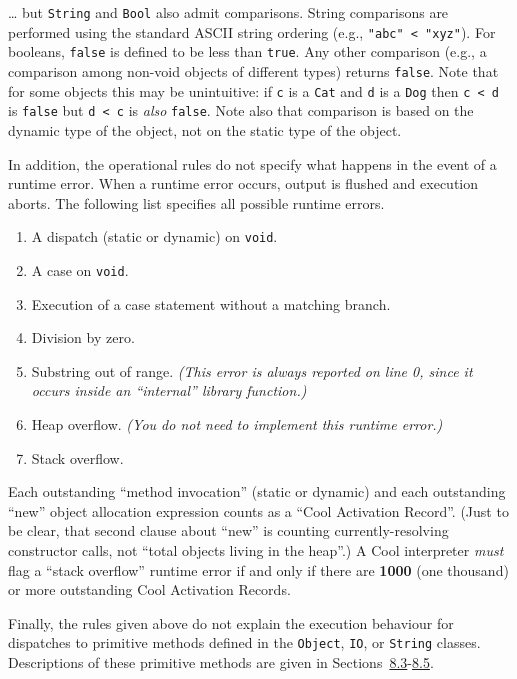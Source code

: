 \documentclass[]{article}
\begin{document}
\ldots{} but \texttt{String} and \texttt{Bool} also admit comparisons.
String comparisons are performed using the standard ASCII string
ordering (e.g., \texttt{"abc" \textless{} "xyz"}). For booleans,
\texttt{false} is defined to be less than \texttt{true}. Any other
comparison (e.g., a comparison among non-void objects of different
types) returns \texttt{false}. Note that for some objects this may be
unintuitive: if \texttt{c} is a \texttt{Cat} and \texttt{d} is a
\texttt{Dog} then \texttt{c \textless{} d} is \texttt{false} but
\texttt{d \textless{} c} is \emph{also} \texttt{false}. Note also that
comparison is based on the dynamic type of the object, not on the static
type of the object.

In addition, the operational rules do not specify what happens in the
event of a runtime error. When a runtime error occurs, output is flushed
and execution aborts. The following list specifies all possible runtime
errors.

\begin{enumerate}
\itemsep1pt\parskip0pt
\item
  A dispatch (static or dynamic) on \texttt{void}.
\item
  A case on \texttt{void}.
\item
  Execution of a case statement without a matching branch.
\item
  Division by zero.
\item
  Substring out of range. \emph{(This error is always reported on line
  0, since it occurs inside an ``internal'' library function.)}
\item
  Heap overflow. \emph{(You do not need to implement this runtime
  error.)}
\item
  Stack overflow.
\end{enumerate}

Each outstanding ``method invocation'' (static or dynamic) and each
outstanding ``new'' object allocation expression counts as a ``Cool
Activation Record''. (Just to be clear, that second clause about ``new''
is counting currently-resolving constructor calls, not ``total objects
living in the heap''.) A Cool interpreter \emph{must} flag a ``stack
overflow'' runtime error if and only if there are \textbf{1000} (one
thousand) or more outstanding Cool Activation Records.

Finally, the rules given above do not explain the execution behaviour
for dispatches to primitive methods defined in the \texttt{Object},
\texttt{IO}, or \texttt{String} classes. Descriptions of these primitive
methods are given in
Sections~\href{node29.html\#sec-int}{8.3}-\href{node31.html\#sec-bool}{8.5}.
\end{document}
